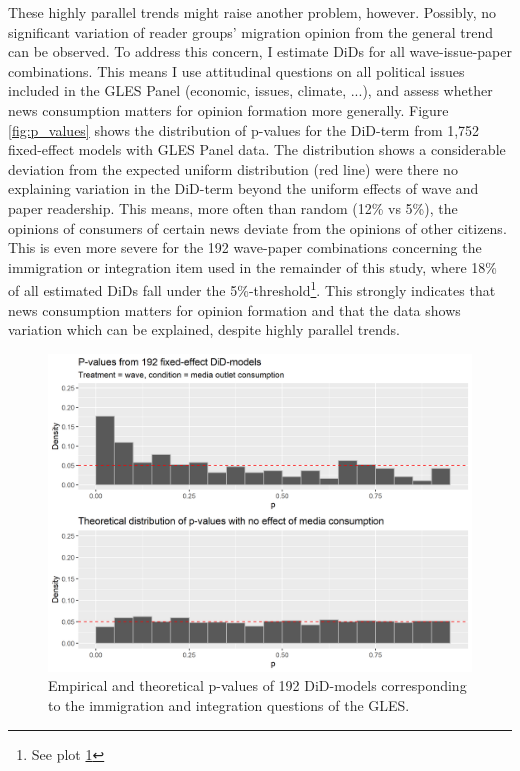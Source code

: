 \documentclass{article}
\begin{document}
These highly parallel trends might raise another problem, however. Possibly, no significant variation of reader groups' migration opinion from the general trend can be observed. To address this concern, I estimate DiDs for all wave-issue-paper combinations. This means I use attitudinal questions on all political issues included in the GLES Panel (economic, issues, climate, ...), and assess whether news consumption matters for opinion formation more generally. Figure \ref{fig:p_values} shows the distribution of p-values for the DiD-term from 1,752 fixed-effect models with GLES Panel data. The distribution shows a considerable deviation from the expected uniform distribution (red line) were there no explaining variation in the DiD-term beyond the uniform effects of wave and paper readership. This means, more often than random (12\% vs 5\%), the opinions of consumers of certain news deviate from the opinions of other citizens. This is even more severe for the 192 wave-paper combinations concerning the immigration or integration item used in the remainder of this study, where 18\% of all estimated DiDs fall under the 5\%-threshold\footnote{See plot \ref{fig:p-val_imm}}.  This strongly indicates that news consumption matters for opinion formation and that the data shows variation which can be explained, despite highly parallel trends.

\begin{figure}[!ht]
    \centering
    \includegraphics[width=\textwidth]{paper/vis/DiD_model_ps_immint.png}
    \caption{Empirical and theoretical p-values of 192 DiD-models corresponding to the immigration and integration questions of the GLES.}
    \label{fig:p-val_imm}
\end{figure}
\end{document}
